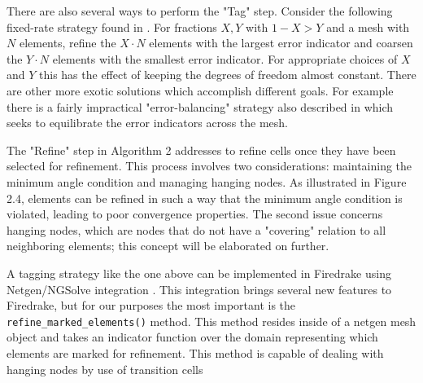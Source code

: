 \documentclass[]{interact}
\theoremstyle{plain}%
\theoremstyle{definition}
\theoremstyle{remark}
\begin{document}
There are also several ways to perform the "Tag" step. Consider the following fixed-rate strategy found in \cite[Chapter 4]{BangerthRannacher2003}. For fractions $X, Y$ with $1 - X > Y$ and a mesh with $N$ elements, refine the $X\cdot N$ elements with the largest error indicator and coarsen the $Y\cdot N$ elements with the smallest error indicator. For appropriate choices of $X$ and $Y$ this has the effect of keeping the degrees of freedom almost constant. There are other more exotic solutions which accomplish different goals. For example there is a fairly impractical "error-balancing" strategy also described in \cite[Chapter 4]{BangerthRannacher2003} which seeks to equilibrate the error indicators across the mesh.

The "Refine" step in Algorithm 2 addresses to refine cells once they have been selected for refinement. This process involves two considerations: maintaining the minimum angle condition and managing hanging nodes. As illustrated in Figure 2.4, elements can be refined in such a way that the minimum angle condition is violated, leading to poor convergence properties. The second issue concerns hanging nodes, which are nodes that do not have a "covering" relation to all neighboring elements; this concept will be elaborated on further.

A tagging strategy like the one above can be implemented in Firedrake using Netgen/NGSolve integration \cite{Betteridgeetal2024}.  This integration brings several new features to Firedrake, but for our purposes the most important is the \texttt{refine\_marked\_elements()} method.  This method resides inside of a netgen mesh object and takes an indicator function over the domain representing which elements are marked for refinement. This method is capable of dealing with hanging nodes by use of transition cells
\end{document}
